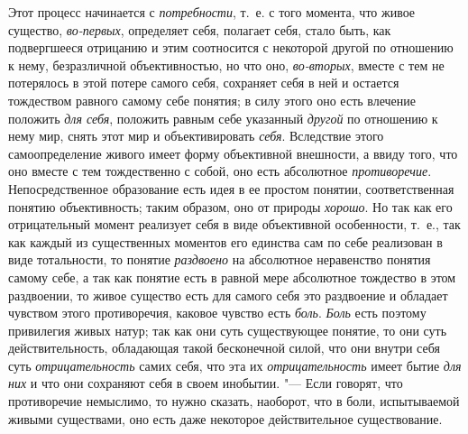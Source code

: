 Этот процесс начинается с
{\em потребности}, т.~е.
с того момента, что живое существо,
{\em во-первых},
определяет себя, полагает себя, стало быть, как подвергшееся
отрицанию и этим соотносится с некоторой другой по отношению к нему,
безразличной объективностью, но что оно,
{\em во-вторых}, вместе с
тем не потерялось в этой потере самого себя, сохраняет себя в ней и
остается тождеством равного самому себе понятия; в силу этого оно есть
влечение положить {\em для себя},
положить равным себе указанный
{\em другой} по отношению
к нему мир, снять этот мир и объективировать
{\em себя}. Вследствие
этого самоопределение живого имеет форму объективной внешности, а ввиду
того, что оно вместе с тем тождественно с собой, оно есть абсолютное
{\em противоречие}.
Непосредственное образование есть идея в ее простом понятии,
соответственная понятию объективность; таким образом, оно от природы
{\em хорошо}. Но так как
его отрицательный момент реализует себя в виде объективной особенности,
т.~е., так как каждый из существенных моментов его единства сам по себе
реализован в виде тотальности, то понятие
{\em раздвоено} на
абсолютное неравенство понятия самому себе, а так как понятие есть в равной
мере абсолютное тождество в этом раздвоении, то живое существо есть для
самого себя это раздвоение и обладает чувством этого противоречия, каковое
чувство есть {\em боль}.
{\em Боль} есть поэтому
привилегия живых натур; так как они суть существующее понятие, то они суть
действительность, обладающая такой бесконечной силой, что они внутри себя
суть {\em отрицательность}
самих себя, что эта их
{\em отрицательность}
имеет бытие {\em для них}
и что они сохраняют себя в своем инобытии. "---
Если говорят, что противоречие немыслимо, то нужно сказать,
наоборот, что в боли, испытываемой живыми существами, оно есть даже
некоторое действительное существование.

